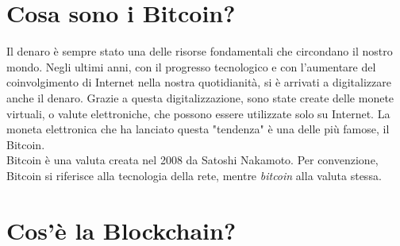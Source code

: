 \section{Cosa sono i Bitcoin?}
Il denaro è sempre stato una delle risorse fondamentali che circondano il nostro mondo. Negli ultimi anni, con il progresso tecnologico e con l'aumentare del coinvolgimento di Internet nella nostra quotidianità, si è arrivati a digitalizzare anche il denaro. Grazie a questa digitalizzazione, sono state create delle monete virtuali, o valute elettroniche, che possono essere utilizzate solo su Internet. La moneta elettronica che ha lanciato questa "tendenza" è una delle più famose, il Bitcoin. \\
Bitcoin è una valuta creata nel 2008 da Satoshi Nakamoto. Per convenzione, Bitcoin si riferisce alla tecnologia della rete, mentre \textit{bitcoin} alla valuta stessa.\\



\section{Cos'è la Blockchain?}